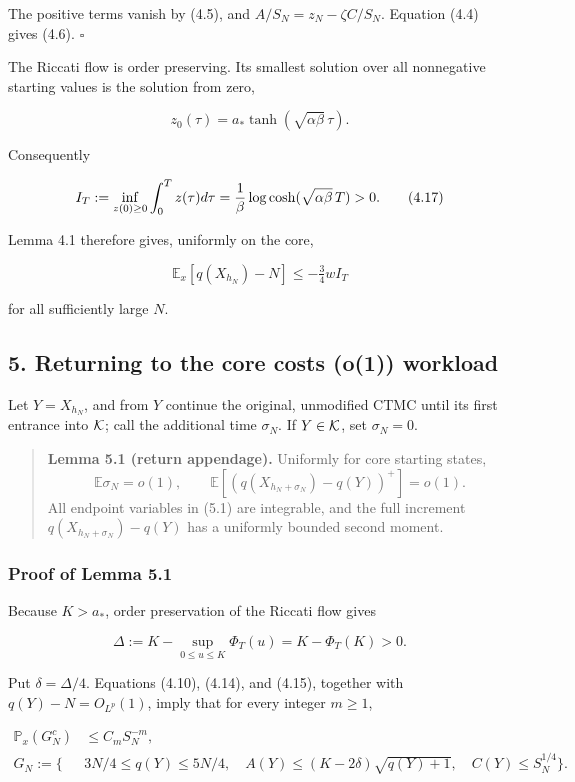 The positive terms vanish by (4.5), and \(A/S_N=z_N-\zeta C/S_N\).
Equation (4.4) gives (4.6). \(\square\)

The Riccati flow is order preserving. Its smallest solution over all
nonnegative starting values is the solution from zero,

\[
 z_0(\tau)=a_*\tanh(\sqrt{\alpha\beta}\,\tau).
\]

Consequently

\[
 I_T:=\inf_{z(0)\ge0}\int_0^Tz(\tau)d\tau
 ={1\over\beta}\log\cosh(\sqrt{\alpha\beta}\,T)>0.        \tag{4.17}
\]

Lemma 4.1 therefore gives, uniformly on the core,

\[
 \mathbb E_x[q(X_{h_N})-N]\le-\tfrac34wI_T                \tag{4.18}
\]

for all sufficiently large \(N\).

\subsection{5. Returning to the core costs (o(1))
workload}

Let \(Y=X_{h_N}\), and from \(Y\) continue the original, unmodified CTMC
until its first entrance into \({\cal K}\); call the additional time
\(\sigma_N\). If \(Y\in{\cal K}\), set \(\sigma_N=0\).

\begin{quote}
\textbf{Lemma 5.1 (return appendage).} Uniformly for core starting
states, \[
\mathbb E\sigma_N=o(1),\qquad
\mathbb E[(q(X_{h_N+\sigma_N})-q(Y))^+]=o(1).             \tag{5.1}
\] All endpoint variables in (5.1) are integrable, and the full
increment \(q(X_{h_N+\sigma_N})-q(Y)\) has a uniformly bounded second
moment.
\end{quote}

\subsubsection{Proof of Lemma 5.1}

Because \(K>a_*\), order preservation of the Riccati flow gives

\[
 \Delta:=K-\sup_{0\le u\le K}\Phi_T(u)
        =K-\Phi_T(K)>0.                                   \tag{5.2}
\]

Put \(\delta=\Delta/4\). Equations (4.10), (4.14), and (4.15), together
with \(q(Y)-N=O_{L^p}(1)\), imply that for every integer \(m\ge1\),

\[
\begin{split}
 \mathbb P_x(G_N^c)&\le C_mS_N^{-m},\\
 G_N:=\bigl\{&
 3N/4\le q(Y)\le5N/4,\quad
 A(Y)\le(K-2\delta)\sqrt{q(Y)+1},\quad
 C(Y)\le S_N^{1/4}\bigr\}.
\end{split}                                                \tag{5.3}
\]

